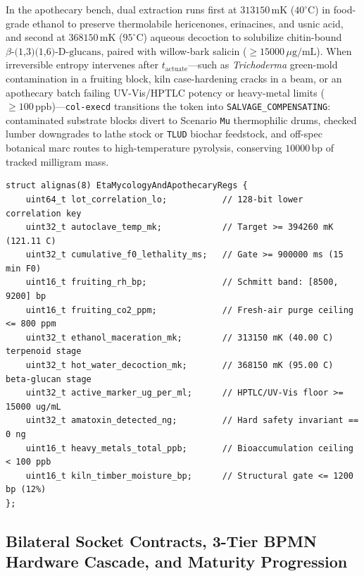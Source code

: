 In the apothecary bench, dual extraction runs first at $313150\,\mathrm{mK}$ ($40^\circ\mathrm{C}$) in food-grade ethanol to preserve
thermolabile hericenones, erinacines, and usnic acid, and second at $368150\,\mathrm{mK}$ ($95^\circ\mathrm{C}$) aqueous decoction to solubilize
chitin-bound $\beta\text{-(1,3)(1,6)-D-glucans}$, paired with willow-bark salicin ($\ge 15000\,\mu\mathrm{g/mL}$). When irreversible entropy
intervenes after $t_{\mathrm{actuate}}$---such as \emph{Trichoderma} green-mold contamination in a fruiting block, kiln case-hardening cracks in
a beam, or an apothecary batch failing UV-Vis/HPTLC potency or heavy-metal limits ($\ge 100\,\mathrm{ppb}$)---\texttt{col-execd} transitions the
token into \texttt{SALVAGE\_COMPENSATING}: contaminated substrate blocks divert to Scenario \texttt{Mu} thermophilic drums, checked lumber
downgrades to lathe stock or \texttt{TLUD} biochar feedstock, and off-spec botanical marc routes to high-temperature pyrolysis, conserving
$10000\,\mathrm{bp}$ of tracked milligram mass.

\begin{lstlisting}[caption={Scenario \texttt{Eta} Fixed-Point Mycology Autoclave, Fruiting Envelope, and Apothecary Gate Structs},label={lst:eta-structs}]
struct alignas(8) EtaMycologyAndApothecaryRegs {
    uint64_t lot_correlation_lo;           // 128-bit lower correlation key
    uint32_t autoclave_temp_mk;            // Target >= 394260 mK (121.11 C)
    uint32_t cumulative_f0_lethality_ms;   // Gate >= 900000 ms (15 min F0)
    uint16_t fruiting_rh_bp;               // Schmitt band: [8500, 9200] bp
    uint16_t fruiting_co2_ppm;             // Fresh-air purge ceiling <= 800 ppm
    uint32_t ethanol_maceration_mk;        // 313150 mK (40.00 C) terpenoid stage
    uint32_t hot_water_decoction_mk;       // 368150 mK (95.00 C) beta-glucan stage
    uint32_t active_marker_ug_per_ml;      // HPTLC/UV-Vis floor >= 15000 ug/mL
    uint32_t amatoxin_detected_ng;         // Hard safety invariant == 0 ng
    uint16_t heavy_metals_total_ppb;       // Bioaccumulation ceiling < 100 ppb
    uint16_t kiln_timber_moisture_bp;      // Structural gate <= 1200 bp (12%)
};
\end{lstlisting}

\subsection{Bilateral Socket Contracts, 3-Tier BPMN Hardware Cascade, and Maturity Progression}

